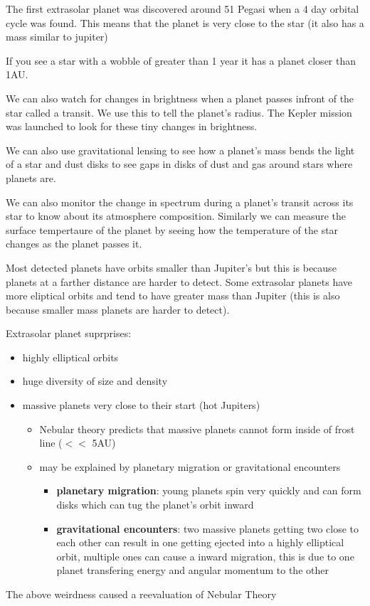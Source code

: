 \documentclass[12pt]{article}
\begin{document}
The first extrasolar planet was discovered around 51 Pegasi when a 4 day orbital cycle was found. This means that the planet is very close to the star (it also has a mass similar to jupiter)

If you see a star with a wobble of greater than 1 year it has a planet closer than 1AU.

We can also watch for changes in brightness when a planet passes infront of the star called a transit. We use this to tell the planet's radius. The Kepler mission was launched to look for these tiny changes in brightness.

We can also use gravitational lensing to see how a planet's mass bends the light of a star and dust disks to see gaps in disks of dust and gas around stars where planets are.

We can also monitor the change in spectrum during a planet's transit across its star to know about its atmosphere composition. Similarly we can measure the surface tempertaure of the planet by seeing how the temperature of the star changes as the planet passes it.

Most detected planets have orbits smaller than Jupiter's but this is because planets at a farther distance are harder to detect. Some extrasolar planets have more eliptical orbits and tend to have greater mass than Jupiter (this is also because smaller mass planets are harder to detect).

Extrasolar planet suprprises:
\begin{itemize}
    \item highly elliptical orbits
    \item huge diversity of size and density
    \item massive planets very close to their start (hot Jupiters)
    \begin{itemize}
        \item Nebular theory predicts that massive planets cannot form inside of frost line ($<<$ 5AU)
        \item may be explained by planetary migration or gravitational encounters
        \begin{itemize}
            \item \textbf{planetary migration}: young planets spin very quickly and can form disks which can tug the planet's orbit inward
            \item \textbf{gravitational encounters}: two massive planets getting two close to each other can result in one getting ejected into a highly elliptical orbit, multiple ones can cause a inward migration, this is due to one planet transfering energy and angular momentum to the other
        \end{itemize}
    \end{itemize}
\end{itemize}
The above weirdness caused a reevaluation of Nebular Theory
\end{document}
